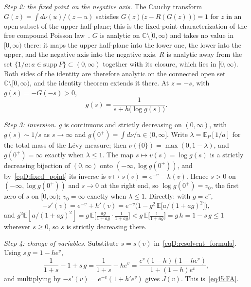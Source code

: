 \documentclass[11pt,letterpaper]{article}
\theoremstyle{plain}
\theoremstyle{definition}
\theoremstyle{remark}
\begin{document}
\emph{Step 2: the fixed point on the negative axis.} The Cauchy transform $G(z) = \int d\nu(u)/(z - u)$ satisfies $G(z)\big(z - R(G(z))\big) = 1$ for $z$ in an open subset of the upper half-plane; this is the fixed-point characterization of the free compound Poisson law~\citep{nicaspeicher2006, wang2023}. $G$ is analytic on $\mathbb{C}\setminus[0,\infty)$ and takes no value in $[0,\infty)$ there: it maps the upper half-plane into the lower one, the lower into the upper, and the negative axis into the negative axis. $R$ is analytic away from the set $\{1/a : a \in \mathrm{supp}\,P\} \subset (0,\infty)$ together with its closure, which lies in $[0,\infty)$. Both sides of the identity are therefore analytic on the connected open set $\mathbb{C}\setminus[0,\infty)$, and the identity theorem extends it there. At $z = -s$, with $g(s) = -G(-s) > 0$,
\begin{equation}
\label{eqD:fixed_point}
g(s) = \frac{1}{s + h\big(\log g(s)\big)} .
\end{equation}

\emph{Step 3: inversion.} $g$ is continuous and strictly decreasing on $(0,\infty)$, with $g(s) \sim 1/s$ as $s \to \infty$ and $g(0^+) = \int d\nu/u \in (0,\infty]$. Write $\lambda = \mathbb{E}_P[1/a]$ for the total mass of the L\'evy measure; then $\nu(\{0\}) = \max(0, 1 - \lambda)$, and $g(0^+) = \infty$ exactly when $\lambda \le 1$. The map $s \mapsto v(s) = \log g(s)$ is a strictly decreasing bijection of $(0,\infty)$ onto $(-\infty, \log g(0^+))$, and by~\eqref{eqD:fixed_point} its inverse is $v \mapsto s(v) = e^{-v} - h(v)$. Hence $s > 0$ on $(-\infty, \log g(0^+))$ and $s \to 0$ at the right end, so $\log g(0^+) = v_0$, the first zero of $s$ on $[0,\infty)$; $v_0 = \infty$ exactly when $\lambda \le 1$. Directly: with $g = e^{v}$,
\begin{equation}
-s'(v) = e^{-v} + h'(v) = e^{-v}\Big(1 - g^2\, \mathbb{E}\big[a/(1 + a g)^2\big]\Big),
\end{equation}
and $g^2\mathbb{E}[a/(1+ag)^2] = g\,\mathbb{E}\big[\tfrac{ag}{1+ag}\cdot\tfrac{1}{1+ag}\big] < g\,\mathbb{E}\big[\tfrac{1}{1+ag}\big] = g\,h = 1 - s\,g \le 1$ wherever $s \ge 0$, so $s$ is strictly decreasing there.

\emph{Step 4: change of variables.} Substitute $s = s(v)$ in~\eqref{eqD:resolvent_formula}. Using $s\,g = 1 - h e^{v}$,
\begin{equation}
\frac{1}{1+s} - 1 + s\,g = \frac{1}{1+s} - h e^{v} = \frac{e^{v}(1-h)(1 - h e^{v})}{1 + (1-h)e^{v}},
\end{equation}
and multiplying by $-s'(v) = e^{-v}(1 + h' e^{v})$ gives $J(v)$. This is~\eqref{eq45:FA}.
\end{document}
